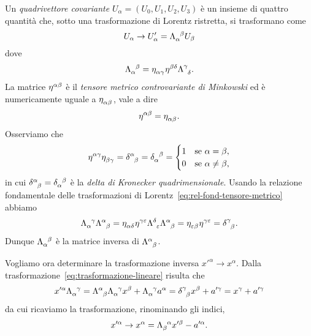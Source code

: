 Un \emph{quadrivettore covariante}
$U_{\alpha} = (U_{0}, U_{1}, U_{2}, U_{3})$ è un insieme di quattro quantità
che, sotto una trasformazione di Lorentz ristretta, si trasformano come
\begin{equation}
  U_{\alpha} \to U'_{\alpha} = \tensor{\Lambda}{_{\alpha}^{\beta}}U_{\beta}
\end{equation}
dove
\begin{equation}
  \tensor{\Lambda}{_{\alpha}^{\beta}} = \tensor{\eta}{_{\alpha\gamma}}
  \tensor{\eta}{^{\beta\delta}} \tensor{\Lambda}{^{\gamma}_{\delta}}.
\end{equation}
La matrice $\tensor{\eta}{^{\alpha\beta}}$ è il
\emph{tensore
  metrico controvariante di Minkowski}
ed è numericamente uguale a $\tensor{\eta}{_{\alpha\beta}}$, vale a dire
\begin{equation}
  \tensor{\eta}{^{\alpha\beta}} = \tensor{\eta}{_{\alpha\beta}}.
\end{equation}
Osserviamo che
\begin{equation}
  \tensor{\eta}{^{\alpha\gamma}} \tensor{\eta}{_{\beta\gamma}} =
  \tensor{\delta}{^{\alpha}_{\beta}} = \tensor{\delta}{_{\alpha}^{\beta}} =
  \begin{cases}
    1 & \text{se } \alpha = \beta, \\
    0 & \text{se } \alpha \neq \beta,
  \end{cases}
\end{equation}
in cui $\tensor{\delta}{^{\alpha}_{\beta}} = \tensor{\delta}{_{\alpha}^{\beta}}$
è la \emph{delta
  di Kronecker quadrimensionale}.
Usando la relazione fondamentale delle trasformazioni di
Lorentz~\eqref{eq:rel-fond-tensore-metrico} abbiamo
\begin{equation}
  \tensor{\Lambda}{_{\alpha}^{\gamma}} \tensor{\Lambda}{^{\alpha}_{\beta}} =
  \tensor{\eta}{_{\alpha\delta}} \tensor{\eta}{^{\gamma\epsilon}}
  \tensor{\Lambda}{^{\delta}_{\epsilon}} \tensor{\Lambda}{^{\alpha}_{\beta}} =
  \tensor{\eta}{_{\epsilon\beta}} \tensor{\eta}{^{\gamma\epsilon}} =
  \tensor{\delta}{^{\gamma}_{\beta}}.
\end{equation}
Dunque $\tensor{\Lambda}{_{\alpha}^{\beta}}$ è la matrice inversa di
$\tensor{\Lambda}{^{\alpha}_{\beta}}$.

Vogliamo ora determinare la trasformazione inversa $x'^{\alpha} \to x^{\alpha}$.
Dalla trasformazione~\eqref{eq:trasformazione-lineare} risulta che
\begin{equation}
  x'^{\alpha} \tensor{\Lambda}{_{\alpha}^{\gamma}} =
  \tensor{\Lambda}{^{\alpha}_{\beta}} \tensor{\Lambda}{_{\alpha}^{\gamma}}
  x^{\beta} + \tensor{\Lambda}{_{\alpha}^{\gamma}} a^{\alpha} =
  \tensor{\delta}{^{\gamma}_{\beta}} x^{\beta} + a'^{\gamma} = x^{\gamma}
  +a'^{\gamma}
\end{equation}
da cui ricaviamo la trasformazione, rinominando gli indici,
\begin{equation}
  \label{eq:trasformazione-inversa}
  x'^{\alpha} \to x^{\alpha} = \tensor{\Lambda}{_{\beta}^{\alpha}}x'^{\beta} -
  a'^{\alpha}.
\end{equation}

